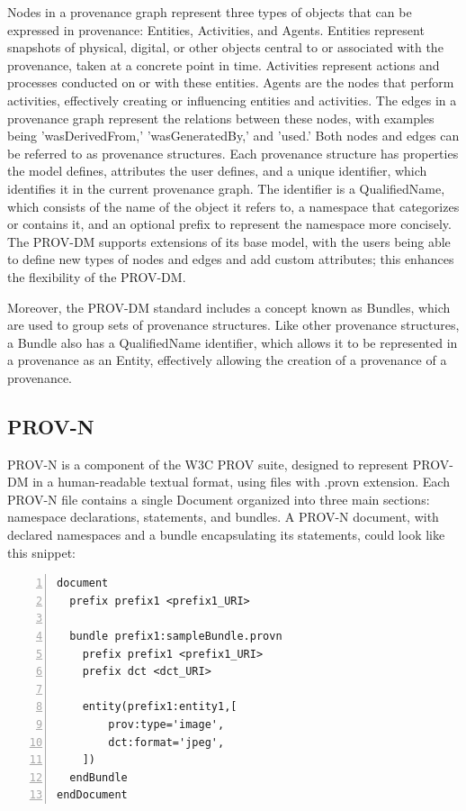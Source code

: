 \documentclass[
  digital,     %
  oneside,     %
  nosansbold,  %
  nocolorbold, %
  lof,         %
  lot,         %
]{fithesis4}
\begin{document}
Nodes in a provenance graph represent three types of objects that can be expressed in provenance: Entities, Activities, and Agents. Entities represent snapshots of physical, digital, or other objects central to or associated with the provenance, taken at a concrete point in time. Activities represent actions and processes conducted on or with these entities. Agents are the nodes that perform activities, effectively creating or influencing entities and activities. The edges in a provenance graph represent the relations between these nodes, with examples being 'wasDerivedFrom,' 'wasGeneratedBy,' and 'used.' Both nodes and edges can be referred to as provenance structures. Each provenance structure has properties the model defines, attributes the user defines, and a unique identifier, which identifies it in the current provenance graph. The identifier is a QualifiedName, which consists of the name of the object it refers to, a namespace that categorizes or contains it, and an optional prefix to represent the namespace more concisely. The PROV-DM supports extensions of its base model, with the users being able to define new types of nodes and edges and add custom attributes; this enhances the flexibility of the PROV-DM.

Moreover, the PROV-DM standard includes a concept known as Bundles, which are used to group sets of provenance structures. Like other provenance structures, a Bundle also has a QualifiedName identifier, which allows it to be represented in a provenance as an Entity, effectively allowing the creation of a provenance of a provenance.
\shorthandon{-}

\subsection{PROV-N}
\shorthandoff{-}
PROV-N \cite{provn} is a component of the W3C PROV suite, designed to represent PROV-DM in a human-readable textual format, using files with .provn extension. Each PROV-N file contains a single Document organized into three main sections: namespace declarations, statements, and bundles. A PROV-N document, with declared namespaces and a bundle encapsulating its statements, could look like this snippet: 

\begin{center}
\begin{lstlisting}[numbers=left,
    stepnumber=1,
    tabsize=4,
    breaklines=true,
    breakatwhitespace=false,
    xleftmargin=3.5em
    ]
document
  prefix prefix1 <prefix1_URI>

  bundle prefix1:sampleBundle.provn
    prefix prefix1 <prefix1_URI>
    prefix dct <dct_URI>

    entity(prefix1:entity1,[
        prov:type='image',
        dct:format='jpeg',
    ])
  endBundle
endDocument
\end{lstlisting}
\end{center}
\end{document}
